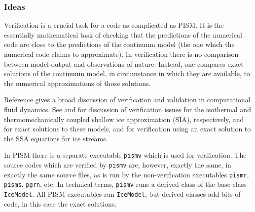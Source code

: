 \documentclass[11pt,final]{amsart}
\begin{document}
\subsubsection*{Ideas}  Verification is a crucial task for a code as complicated as PISM.  It is the essentially mathematical task of checking that the predictions of the numerical code are close to the predictions of the continuum model (the one which the numerical code claims to approximate).  In verification there is no comparison between model output and observations of nature.  Instead, one compares exact solutions of the continuum model, in circumstance in which they are available, to the numerical approximations of those solutions.

Reference \cite{Roache} gives a broad discussion of verification and validation in computational fluid dynamics. See \cite{BLKCB} and \cite{BBL} for discussion of verification issues for the isothermal and thermomechanically coupled shallow ice approximation (SIA), respectively, and for exact solutions to these models, and \cite{BBssasliding,SchoofStream} for verification using an exact solution to the SSA equations for ice streams.  

In PISM there is a separate executable \verb|pismv| which is used for verification.  The source codes which are verified by \verb|pismv| are, however, exactly the same, in exactly the same source files, as is run by the non-verification executables \verb|pismr|, \verb|pisms|, \verb|pgrn|, etc.  In technical terms, \verb|pismv| runs a derived class of the base class \verb|IceModel|.  All PISM executables run \verb|IceModel|, but derived classes add bits of code, in this case the exact solutions.
\end{document}
